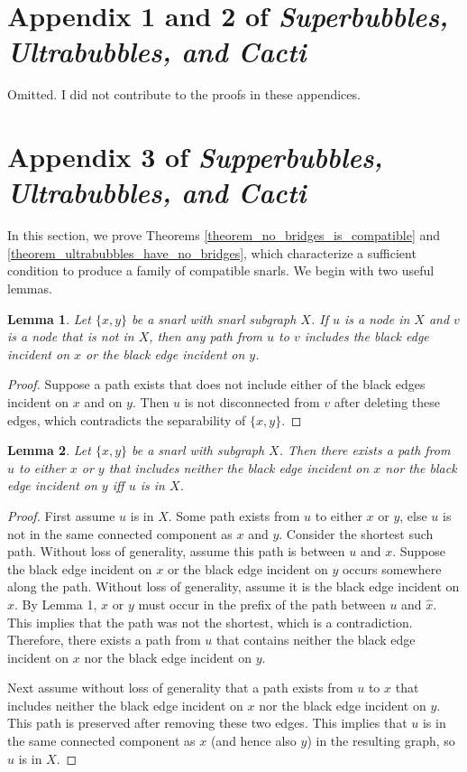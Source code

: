 \documentclass[11pt]{ucthesis}
\newtheorem{lemma}{Lemma}
\newtheorem*{proof}{Proof}
\begin{document}
\section{Appendix 1 and 2 of \emph{Superbubbles, Ultrabubbles, and Cacti}}

Omitted. I did not contribute to the proofs in these appendices.

\section{Appendix 3 of \emph{Supperbubbles, Ultrabubbles, and Cacti}}

\setcounter{lemma}{9} 

In this section, we prove Theorems \ref{theorem_no_bridges_is_compatible} and \ref{theorem_ultrabubbles_have_no_bridges}, which characterize a sufficient condition to produce a family of compatible snarls. We begin with two useful lemmas.

\begin{lemma}
	Let $\{x, y\}$ be a snarl with snarl subgraph $X$. If $u$ is a node in $X$ and $v$ is a node that is not in $X$, then any path from $u$ to $v$ includes the black edge incident on $x$ or the black edge incident on $y$.
	\label{lemma_snarl_path_inside_to_outside}
\end{lemma}
\begin{proof}
	Suppose a path exists that does not include either of the black edges incident on $x$ and on $y$. Then $u$ is not disconnected from $v$ after deleting these edges, which contradicts the separability of $\{x, y\}$.
\end{proof}

\begin{lemma}
	Let $\{x,y\}$ be a snarl with subgraph $X$. Then there exists a path from $u$ to either $x$ or $y$ that includes neither the black edge incident on $x$ nor the black edge incident on $y$ iff $u$ is in $X$.
	\label{lemma_snarl_path_completely_inside}
\end{lemma}
\begin{proof}
	 First assume $u$ is in $X$. Some path exists from $u$ to either $x$ or $y$, else $u$ is not in the same connected component as $x$ and $y$. Consider the shortest such path. Without loss of generality, assume this path is between $u$ and $x$. Suppose the black edge incident on $x$ or the black edge incident on $y$ occurs somewhere along the path. Without loss of generality, assume it is the black edge incident on $x$. By Lemma 1, $x$ or $y$ must occur in the prefix of the path between $u$ and $\hat x$. This implies that the path was not the shortest, which is a contradiction. Therefore, there exists a path from $u$ that contains neither the black edge incident on $x$ nor the black edge incident on $y$.
	
	Next assume without loss of generality that a path exists from $u$ to $x$ that includes neither the black edge incident on $x$ nor the black edge incident on $y$. This path is preserved after removing these two edges. This implies that $u$ is in the same connected component as $x$ (and hence also $y$) in the resulting graph, so $u$ is in $X$.
\end{proof}
\end{document}
